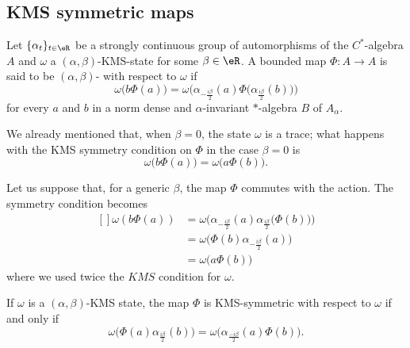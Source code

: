 \subsection{KMS symmetric maps}

\begin{definition}
	Let $\{ \alpha_t \}_{t\in\eR}$ be a strongly continuous group of automorphisms of the $C^*$-algebra $A$ and $\omega$ a $(\alpha,\beta)$-KMS-state for some $\beta\in\eR$. A bounded map $\Phi\colon A\to A$ is said to be $(\alpha,\beta)$- with respect to $\omega$ if
	\begin{equation}		\label{EqKMSCondPhi}
		\omega\big( b\Phi(a) \big)=\omega\Big( \alpha_{-\frac{ i\beta }{2}}(a)\Phi\big( \alpha_{\frac{ i\beta }{2}}(b) \big) \Big)
	\end{equation}
	for every $a$ and $b$ in a norm dense and $\alpha$-invariant $*$-algebra $B$ of $A_{\alpha}$. 
\end{definition}
We already mentioned that, when $\beta=0$, the state $\omega$ is a trace; what happens with the KMS symmetry condition on $\Phi$ in the case $\beta=0$ is
\begin{equation}
	\omega\big( b\Phi(a) \big)=\omega\big( a\Phi(b) \big).
\end{equation}

Let us suppose that, for a generic $\beta$, the map $\Phi$ commutes with the action. The symmetry condition becomes
\begin{equation}
	\begin{aligned}[]
		\omega(b\Phi(a))&=\omega\Big( \alpha_{-\frac{ i\beta }{2}}(a)\alpha_{\frac{ i\beta }{2}}\big( \Phi(b) \big) \Big)\\
		&=\omega\big( \Phi(b)\alpha_{-\frac{ i\beta }{2}}(a) \big)\\
		&=\omega\big( a\Phi(b) \big)
	\end{aligned}
\end{equation}
where we used twice the $KMS$ condition for $\omega$.

\begin{lemma}
	If $\omega$ is a $(\alpha,\beta)$-KMS state, the map $\Phi$ is KMS-symmetric with respect to $\omega$ if and only if
	\begin{equation}
		\omega\big( \Phi(a)\alpha_{\frac{ i\beta }{2}}(b) \big)=\omega\big( \alpha_{\frac{-i\beta }{2}}(a)\Phi(b) \big).
	\end{equation}
\end{lemma}

